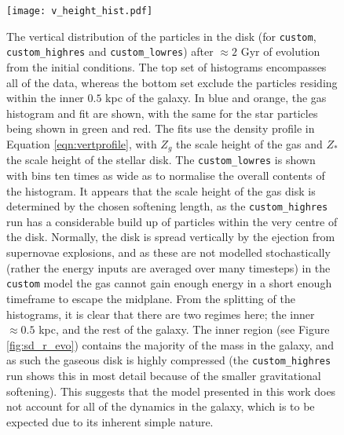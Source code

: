 \begin{figure}
    \centering
    \texttt{[image: v\_height\_hist.pdf]}
    \caption{The vertical distribution of the particles in the disk (for {\tt custom}, {\tt custom\_highres} and {\tt custom\_lowres}) after $\approx 2$ Gyr of evolution from the initial conditions. The top set of histograms encompasses all of the data, whereas the bottom set exclude the particles residing within the inner $0.5$ kpc of the galaxy. In blue and orange, the gas histogram and fit are shown, with the same for the star particles being shown in green and red. The fits use the density profile in Equation \ref{eqn:vertprofile}, with $Z_g$ the scale height of the gas and $Z_*$ the scale height of the stellar disk. The {\tt custom\_lowres} is shown with bins ten times as wide as to normalise the overall contents of the histogram. It appears that the scale height of the gas disk is determined by the chosen softening length, as the {\tt custom\_highres} run has a considerable build up of particles within the very centre of the disk. Normally, the disk is spread vertically by the ejection from supernovae explosions, and as these are not modelled stochastically (rather the energy inputs are averaged over many timesteps) in the {\tt custom} model the gas cannot gain enough energy in a short enough timeframe to escape the midplane. From the splitting of the histograms, it is clear that there are two regimes here; the inner $\approx 0.5$ kpc, and the rest of the galaxy. The inner region (see Figure \ref{fig:sd_r_evo}) contains the majority of the mass in the galaxy, and as such the gaseous disk is highly compressed (the {\tt custom\_highres} run shows this in most detail because of the smaller gravitational softening). This suggests that the model presented in this work does not account for all of the dynamics in the galaxy, which is to be expected due to its inherent simple nature.}
    \label{fig:vheighthist}
\end{figure}
